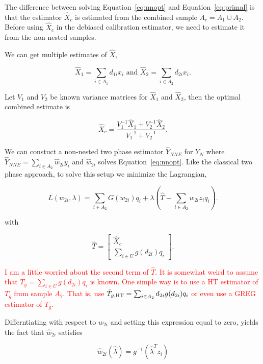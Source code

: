 \documentclass[12pt]{article}
\begin{document}
The difference
between solving Equation~\ref{eq:nnopt} and Equation~\ref{eq:primal} is that the
estimator $\hat X_{c}$ is estimated from the combined sample $A_c= A_1 \cup A_2$. Before using
$\hat X_{c}$ in the debiased calibration estimator, we need to estimate it
from the non-nested samples.

We can get multiple estimates of $\hat X$, 

$$\hat X_1 = \sum_{i \in A_1} d_{1i} x_i \text{ and }
\hat X_2 = \sum_{i \in A_2} d_{2i} x_i.$$

Let $V_1$ and $V_2$ be known variance matrices for $\hat X_1$ and $\hat X_2$,
then the optimal combined estimate is 

$$\hat X_c = \frac{V_1^{-1} \hat X_1 + V_2^{-1} \hat X_2}{V_1^{-1} + V_2^{-1}}.$$

We can constuct a non-nested two phase estimator $\hat Y_{NNE}$ for $Y_N$ where
$\hat Y_{NNE} = \sum_{i \in A_2} \hat w_{2i} y_i$ and $\hat w_{2i}$ solves
Equation~\ref{eq:nnopt}. Like the classical two phase approach, to solve this
setup we minimize the Lagrangian,

\begin{equation}\label{eq:legragedc2}
  L(w_{2i}, \lambda) = \sum_{i \in A_2} G(w_{2i}) q_i + \lambda 
  \left( \hat T - \sum_{i \in A_2} w_{2i} z_i q_i\right).
\end{equation}

with 

$$\hat T = 
\begin{bmatrix}
  \hat X_c \\ \sum_{i \in U} g(d_{2i}) q_i
\end{bmatrix}.
$$


\textcolor{red}{I am a little worried about the second term of $\hat{T}$. It is somewhat weird to assume that $T_g= \sum_{i \in U} g(d_{2i}) q_i$ is known. One simple way is to use a HT estimator  of $T_g$ from sample $A_2$. That is, use $\hat{T}_{g, {\rm HT}} = \sum_{i \in A_2} d_{2i} g( d_{2i}) q_i$ or even use a GREG estimator of $T_g$. 
}

Differntiating with respect to $w_{2i}$ and setting this expression equal to
zero, yields the fact that $\hat w_{2i}$ satisfies 

$$ \hat w_{2i}(\hat \lambda) = g^{-1}(\hat \lambda^T z_i) $$
\end{document}
